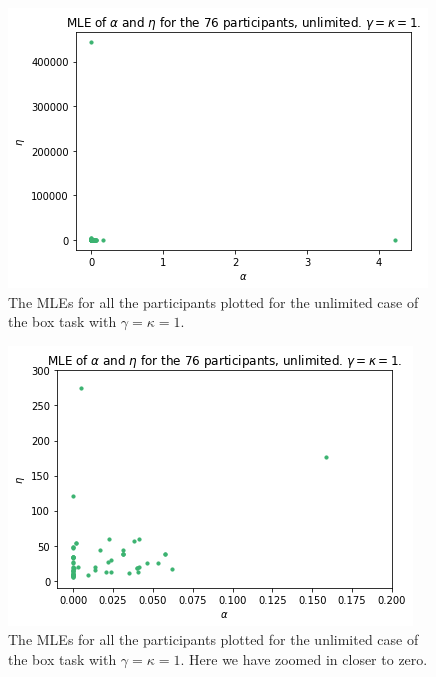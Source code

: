\begin{figure}
    \centering
    \includegraphics[scale=0.7]{pictures/plotted_mles_unlim_gk1.png}
    \caption[MLEs of $\alpha$ and $\eta$, unlimited with $\gamma=\kappa=1$.]{The MLEs for all the participants plotted for the unlimited case of the box task with $\gamma=\kappa=1$.}
    \label{fig:plot_all_mles_unlim_zoom0}
\end{figure}

\begin{figure}
    \centering
    \includegraphics[scale=0.7]{pictures/plotted_mles_unlim_gk1_zoom1.png}
    \caption[MLEs of $\alpha$ and $\eta$, unlimited with $\gamma=\kappa=1$, zoomed.]{The MLEs for all the participants plotted for the unlimited case of the box task with $\gamma=\kappa=1$. Here we have zoomed in closer to zero.}
    \label{fig:plot_all_mles_unlim_zoom1}
\end{figure}

